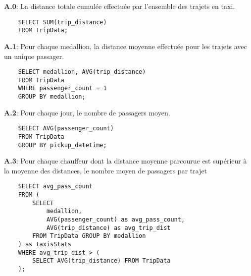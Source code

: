 \textbf{A.0}: La distance totale cumulée effectuée par l'ensemble des trajets en taxi.
\begin{verbatim}
    SELECT SUM(trip_distance)
    FROM TripData;
\end{verbatim}

\textbf{A.1}: Pour chaque medallion, la distance moyenne effectuée pour les trajets avec un unique passager.
\begin{verbatim}
    SELECT medallion, AVG(trip_distance)
    FROM TripData
    WHERE passenger_count = 1
    GROUP BY medallion;
\end{verbatim}

\noindent\textbf{A.2}: Pour chaque jour, le nombre de passagers moyen.
\begin{verbatim}
    SELECT AVG(passenger_count)
    FROM TripData
    GROUP BY pickup_datetime;
\end{verbatim}

\noindent\textbf{A.3}: Pour chaque chauﬀeur dont la distance moyenne parcourue est supérieur à la moyenne des distances, le nombre moyen de passagers par trajet
\begin{verbatim}
    SELECT avg_pass_count
    FROM (
        SELECT
            medallion,
            AVG(passenger_count) as avg_pass_count,
            AVG(trip_distance) as avg_trip_dist
        FROM TripData GROUP BY medallion
    ) as taxisStats
    WHERE avg_trip_dist > (
        SELECT AVG(trip_distance) FROM TripData
    );
\end{verbatim}